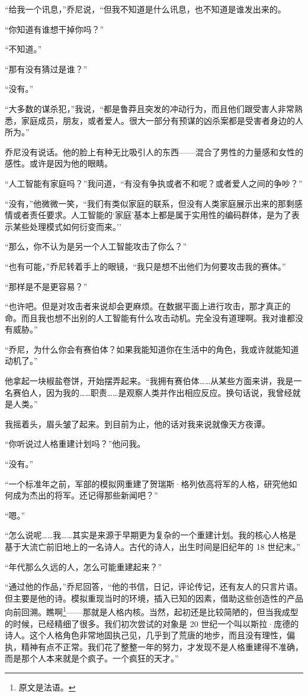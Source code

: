 \documentclass[AutoFakeBold=true]{book}
\begin{document}
``给我一个讯息，''乔尼说，``但我不知道是什么讯息，也不知道是谁发出来的。

``你知道有谁想干掉你吗？''

``不知道。''

``那有没有猜过是谁？''

``没有。''

``大多数的谋杀犯，''我说，``都是鲁莽且突发的冲动行为，而且他们跟受害人非常熟悉，家庭成员，朋友，或者爱人。很大一部分有预谋的凶杀案都是受害者身边的人所为。''

乔尼没有说话。他的脸上有种无比吸引人的东西——混合了男性的力量感和女性的感性。或许是因为他的眼睛。

``人工智能有家庭吗？''我问道，``有没有争执或者不和呢？或者爱人之间的争吵？''

``没有，''他微微一笑，``我们有类似家庭的联系，但没有人类家庭展示出来的那剩感情或者责任要求。人工智能的`家庭'基本上都是属于实用性的编码群体，是为了表示某些处理模式如何衍变而来。''

``那么，你不认为是另一个人工智能攻击了你么？''

``也有可能，''乔尼转着手上的眼镜，``我只是想不出他们为何要攻击我的赛体。''

``那样是不是更容易？''

``也许吧。但是对攻击者来说却会更麻烦。在数据平面上进行攻击，那才真正的命。而且我也想不出别的人工智能有什么攻击动机。完全没有道理啊。我对谁都没有威胁。''

``乔尼，为什么你会有赛伯体？如果我能知道你在生活中的角色，我或许就能知道动机了。''

他拿起一块椒盐卷饼，开始摆弄起来。``我拥有赛伯体……从某些方面来讲，我是一名赛伯人，因为我的……职责……是观察人类并作出相应反应。换句话说，我曾经就是人类。''

我摇着头，眉头皱了起来。到目前为止，他的话对我来说就像天方夜谭。

``你听说过人格重建计划吗？''他问我。

``没有。''

``一个标准年之前，军部的模拟网重建了贺瑞斯·格列依高将军的人格，研究他如何成为杰出的将军。还记得那些新闻吧？''

``嗯。''

``怎么说呢……我……其实是来源于早期更为复杂的一个重建计划。我的核心人格是基于大流亡前旧地上的一名诗人。古代的诗人，出生时间是旧纪年的 18 世纪末。''

``年代那么久远的人，怎么可能重建起来？''

``通过他的作品，''乔尼回答，``他的书信，日记，评论传记，还有友人的只言片语。但主要是他的诗。模拟重现当时的环境，插入已知的因素，借助这些创造性的产品向前回溯。{\kaishu 瞧啊}\footnote{原文是法语。}——那就是人格内核。当然，起初还是比较简陋的，但当我成型的时候，已经精细了很多。我们初次尝试的对象是 20 世纪一个叫以斯拉·庞德的诗人。这个人格角色非常地固执己见，几乎到了荒唐的地步，而且没有理性，偏执，精神有点不正常。我们花了整整一年的努力，才发现不是人格重建得不准确，而是那个人本来就是个疯子。一个疯狂的天才。''
\end{document}

